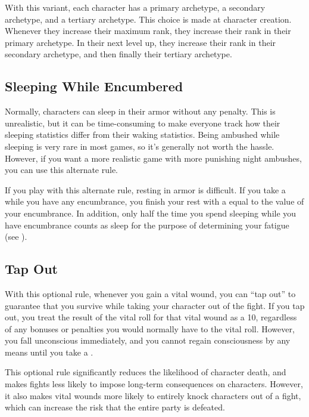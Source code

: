         With this variant, each character has a primary archetype, a secondary archetype, and a tertiary archetype.
        This choice is made at character creation.
        Whenever they increase their maximum rank, they increase their rank in their primary archetype.
        In their next level up, they increase their rank in their secondary archetype, and then finally their tertiary archetype.

    \subsection{Sleeping While Encumbered}
        Normally, characters can sleep in their armor without any penalty.
        This is unrealistic, but it can be time-consuming to make everyone track how their sleeping statistics differ from their waking statistics.
        Being ambushed while sleeping is very rare in most games, so it's generally not worth the hassle.
        However, if you want a more realistic game with more punishing night ambushes, you can use this alternate rule.

        If you play with this alternate rule, resting in armor is difficult.
        If you take a  while you have any encumbrance, you finish your rest with a  equal to the value of your encumbrance.
        In addition, only half the time you spend sleeping while you have encumbrance counts as sleep for the purpose of determining your fatigue (see ).

    \subsection{Tap Out}
        With this optional rule, whenever you gain a vital wound, you can ``tap out'' to guarantee that you survive while taking your character out of the fight.
        If you tap out, you treat the result of the vital roll for that vital wound as a 10, regardless of any bonuses or penalties you would normally have to the vital roll.
        However, you fall unconscious immediately, and you cannot regain consciousness by any means until you take a .

        This optional rule significantly reduces the likelihood of character death, and makes fights less likely to impose long-term consequences on characters.
        However, it also makes vital wounds more likely to entirely knock characters out of a fight, which can increase the risk that the entire party is defeated.
